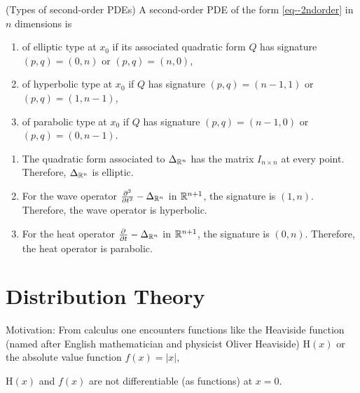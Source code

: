 \documentclass[11pt]{article}
\begin{document}
				\begin{defi}
					(Types of second-order PDEs) A second-order PDE of the form \eqref{eq--2ndorder} in $n$ dimensions is
					\begin{enumerate}
						\item of elliptic type at $x_0$ if its associated quadratic form $Q$ has signature $(p,q)=(0,n)$ or $(p,q)=(n,0)$,
						\item of hyperbolic type at $x_0$ if $Q$ has signature $(p,q)=(n-1,1)$ or $(p,q)=(1,n-1)$,
						\item of parabolic type at $x_0$ if $Q$ has signature $(p,q)=(n-1,0)$ or $(p,q)=(0,n-1)$.
					\end{enumerate}
				\end{defi}

				\begin{eg}
					\begin{enumerate}
						\item The quadratic form associated to $\Delta_{\R^n}$ has the matrix $I_{n\times n}$ at every point. Therefore, $\Delta_{\R^n}$ is elliptic.
						\item For the wave operator $\del[2]{}{t^2}-\Delta_{\R^n}$ in $\R^{n+1}$, the signature is $(1,n)$. Therefore, the wave operator is hyperbolic.
						\item For the heat operator $\del[]{}{t}-\Delta_{\R^n}$ in $\R^{n+1}$, the signature is $(0,n)$. Therefore, the heat operator is parabolic.
					\end{enumerate}
				\end{eg}

		\section{Distribution Theory}

			\noindent Motivation: From calculus one encounters functions like the Heaviside function (named after English mathematician and physicist Oliver Heaviside) $\mathrm{H}(x)$ or the absolute value function $f(x)=|x|$,
			\begin{center}
				\qquad\qquad
			\end{center}
			$\mathrm{H}(x)$ and $f(x)$ are not differentiable (as functions) at $x=0$.
			\\
\end{document}
